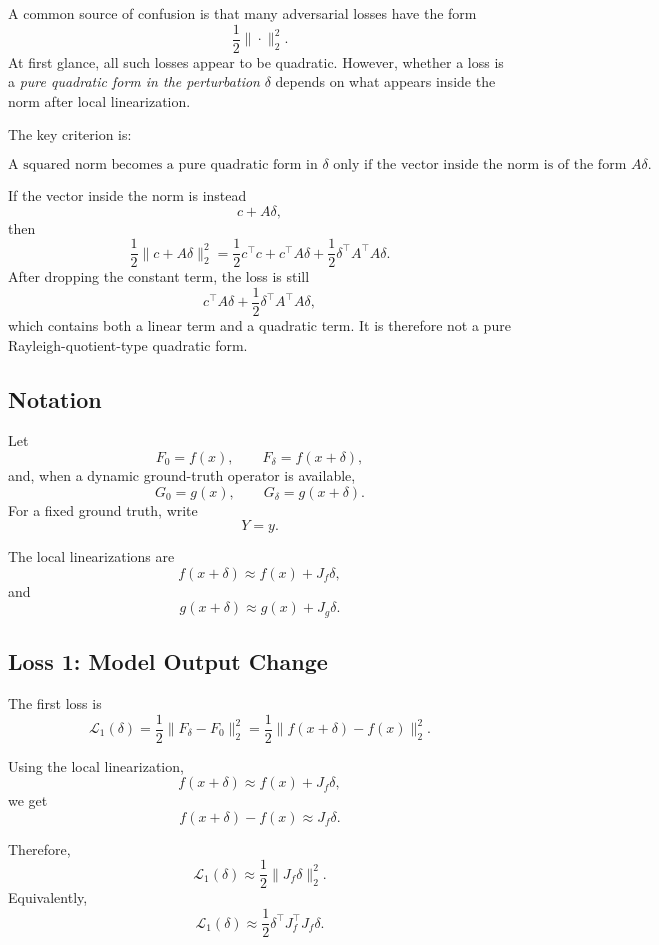 \documentclass{article}
\begin{document}
A common source of confusion is that many adversarial losses have the form
\[
    \frac{1}{2}\|\cdot\|_2^2.
\]
At first glance, all such losses appear to be quadratic. However, whether a loss is a \emph{pure quadratic form in the perturbation} \(\delta\) depends on what appears inside the norm after local linearization.

The key criterion is:

\[
\boxed{
\text{A squared norm becomes a pure quadratic form in } \delta
\text{ only if the vector inside the norm is of the form } A\delta.
}
\]

If the vector inside the norm is instead
\[
    c + A\delta,
\]
then
\[
    \frac{1}{2}\|c+A\delta\|_2^2
    =
    \frac{1}{2}c^\top c
    +
    c^\top A\delta
    +
    \frac{1}{2}\delta^\top A^\top A\delta.
\]
After dropping the constant term, the loss is still
\[
    c^\top A\delta
    +
    \frac{1}{2}\delta^\top A^\top A\delta,
\]
which contains both a linear term and a quadratic term. It is therefore not a pure Rayleigh-quotient-type quadratic form.

\subsection{Notation}

Let
\[
    F_0=f(x),
    \qquad
    F_\delta=f(x+\delta),
\]
and, when a dynamic ground-truth operator is available,
\[
    G_0=g(x),
    \qquad
    G_\delta=g(x+\delta).
\]
For a fixed ground truth, write
\[
    Y=y.
\]

The local linearizations are
\[
    f(x+\delta)
    \approx
    f(x)+J_f\delta,
\]
and
\[
    g(x+\delta)
    \approx
    g(x)+J_g\delta.
\]

\subsection{Loss 1: Model Output Change}

The first loss is
\[
    \mathcal L_1(\delta)
    =
    \frac{1}{2}\|F_\delta-F_0\|_2^2
    =
    \frac{1}{2}\|f(x+\delta)-f(x)\|_2^2.
\]

Using the local linearization,
\[
    f(x+\delta)
    \approx
    f(x)+J_f\delta,
\]
we get
\[
    f(x+\delta)-f(x)
    \approx
    J_f\delta.
\]

Therefore,
\[
    \mathcal L_1(\delta)
    \approx
    \frac{1}{2}\|J_f\delta\|_2^2.
\]
Equivalently,
\[
    \mathcal L_1(\delta)
    \approx
    \frac{1}{2}\delta^\top J_f^\top J_f\delta.
\]
\end{document}
